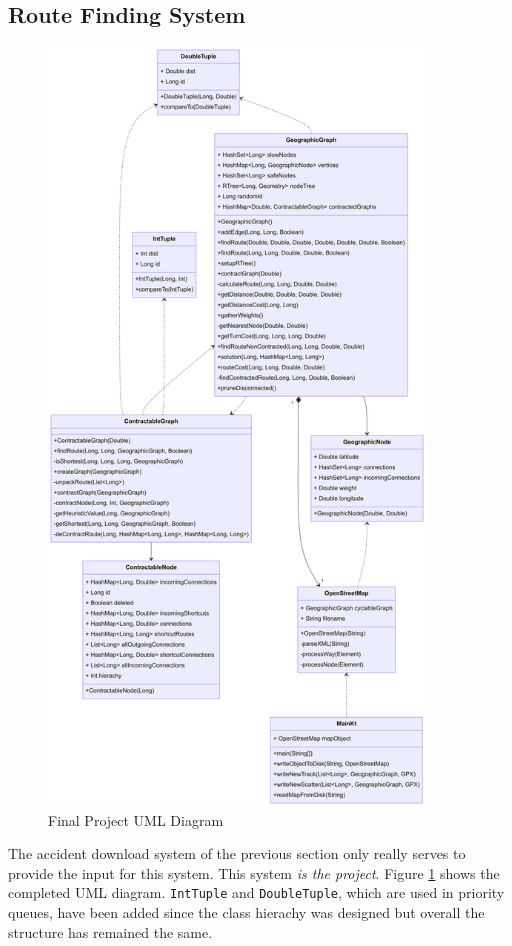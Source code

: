\documentclass[11pt,twoside,a4paper]{article}
\begin{document}
\subsection{Route Finding System}
\begin{figure}
    \begin{center}
        \includegraphics[width=10cm]{finaluml.png}
    \end{center}
    \caption{Final Project UML Diagram}
    \label{finaluml}
\end{figure}
The accident download system of the previous section only really serves to provide the input for this system. This system \textit{is the project}. Figure \ref{finaluml} shows the completed UML diagram. \texttt{IntTuple} and \texttt{DoubleTuple}, which are used in priority queues,  have been added since the class hierachy was designed but overall the structure has remained the same.
\end{document}
